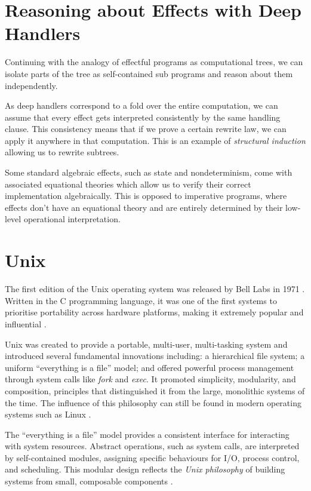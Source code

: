 \documentclass[logo,bsc,singlespacing,parskip]{infthesis}
\begin{document}
\section{Reasoning about Effects with Deep Handlers}
Continuing with the analogy of effectful programs as computational trees, we can isolate parts of the tree as self-contained sub programs and reason about them independently. 

As deep handlers correspond to a fold over the entire computation, we can assume that every effect gets interpreted consistently by the same handling clause. This consistency means that if we prove a certain rewrite law, we can apply it anywhere in that computation. This is an example of \textit{structural induction} allowing us to rewrite subtrees.

Some standard algebraic effects, such as state and nondeterminism, come with associated equational theories which allow us to verify their correct implementation algebraically. This is opposed to imperative programs, where effects don't have an equational theory and are entirely determined by their low-level operational interpretation.

\section{Unix}
The first edition of the Unix operating system was released by Bell Labs in 1971 \cite{ritchie1974unix}. Written in the C programming language, it was one of the first systems to prioritise portability across hardware platforms, making it extremely popular and influential \cite{blair1985critique}.

Unix was created to provide a portable, multi-user, multi-tasking system and introduced several fundamental innovations including: a hierarchical file system; a uniform “everything is a file” model; and offered powerful process management through system calls like \textit{fork} and \textit{exec}.  It promoted simplicity, modularity, and composition, principles that distinguished it from the large, monolithic systems of the time. The influence of this philosophy can still be found in modern operating systems such as Linux \cite{gancarz2003linux}.

The “everything is a file” model provides a consistent interface for interacting with system resources. Abstract operations, such as system calls, are interpreted by self-contained modules, assigning specific behaviours for I/O, process control, and scheduling. This modular design reflects the \textit{Unix philosophy} of building systems from small, composable components \cite{raymond2003art}.
\end{document}

